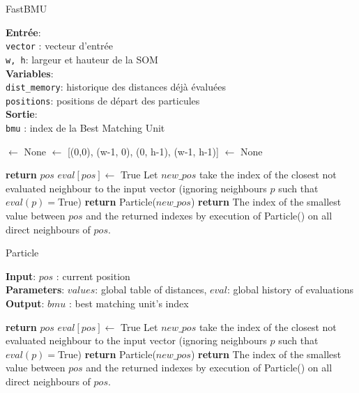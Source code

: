 	\begin{algorithm}[tb]
	\caption{FastBMU}
	\label{fast:alg:bmu}
	\textbf{Entrée}: \\
	{\tt vector} : vecteur d'entrée\\
	{\tt w, h}: largeur et hauteur de la SOM\\
	\textbf{Variables}: \\
	{\tt dist\_memory}: historique des distances déjà évaluées\\
	{\tt positions}: positions de départ des particules\\
	\textbf{Sortie}: \\
	{\tt bmu} : index de la Best Matching Unit
	\begin{algorithmic}[1] %
	 $\xleftarrow{}$ None
	 $\xleftarrow{}$ [(0,0), (w-1, 0), (0, h-1), (w-1, h-1)]
	 $\xleftarrow{}$ None

	\STATE
	\STATE \textbf{return} $pos$
	\ENDIF
	\STATE $eval[pos] \xleftarrow{}$ True
	\STATE Let $new\_pos$ take the index of the closest not evaluated neighbour to the input vector (ignoring neighbours $p$ such that $eval(p)=$True)
	\STATE \textbf{return} Particle($new\_pos$)
	\ENDIF
	\STATE \textbf{return} The index of the smallest value between $pos$ and the returned indexes by execution of Particle() on all direct neighbours of $pos$.
	\end{algorithmic}
	\end{algorithm}

	\begin{algorithm}[tb]
	\caption{Particle}
	\label{fast:alg:particle}
	\textbf{Input}: $pos$ : current position\\
	\textbf{Parameters}: $values$: global table of distances, $eval$: global history of evaluations \\
	\textbf{Output}: $bmu$ : best matching unit's index
	\begin{algorithmic}[1] %
	\STATE \textbf{return} $pos$
	\ENDIF
	\STATE $eval[pos] \xleftarrow{}$ True
	\STATE Let $new\_pos$ take the index of the closest not evaluated neighbour to the input vector (ignoring neighbours $p$ such that $eval(p)=$True)
	\STATE \textbf{return} Particle($new\_pos$)
	\ENDIF
	\STATE \textbf{return} The index of the smallest value between $pos$ and the returned indexes by execution of Particle() on all direct neighbours of $pos$.
	\end{algorithmic}
	\end{algorithm}

